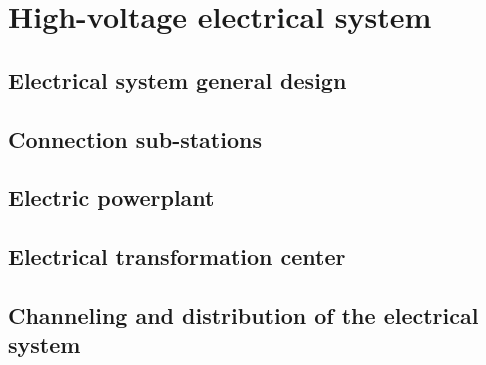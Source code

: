 \chapter{High-voltage electrical system}

	\section{Electrical system general design}
	
	\section{Connection sub-stations}
	
	\section{Electric powerplant}
	
	\section{Electrical transformation center}
	
	\section{Channeling and distribution of the electrical system}
	